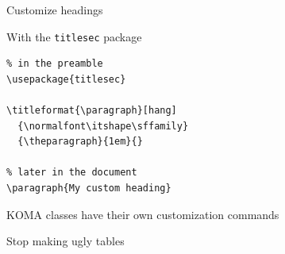 \documentclass[xetex, onlymath, handout]{beamer}
\begin{document}
\begin{frame}[fragile]{Customize headings}

  \begin{exampleblock}{With the \texttt{titlesec} package}
    \begin{lstlisting}
% in the preamble
\usepackage{titlesec}

\titleformat{\paragraph}[hang]
  {\normalfont\itshape\sffamily}
  {\theparagraph}{1em}{}

% later in the document
\paragraph{My custom heading}
    \end{lstlisting}
  \end{exampleblock}

  \begin{block}{}
    KOMA classes have their own customization commands
  \end{block}
\end{frame}

\begin{frame}[fragile]{Stop making ugly tables}


\end{frame}
\end{document}
